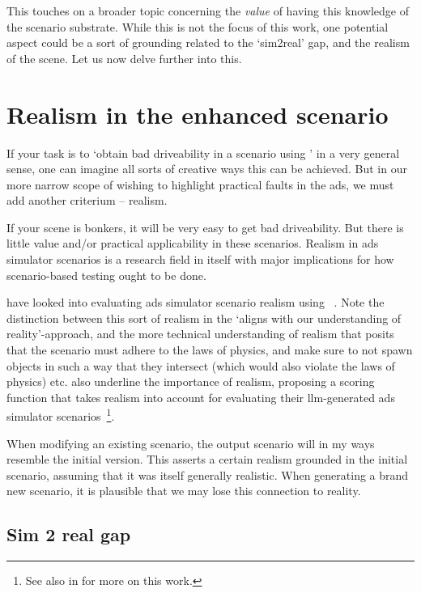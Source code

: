This touches on a broader topic concerning the \emph{value} of having this knowledge of the
scenario substrate. While this is not the focus of this work, one potential aspect could be a sort
of grounding related to the `sim2real' gap, and the realism of the scene. Let us now delve further
into this.

\section{Realism in the enhanced scenario}

If your task is to `obtain bad driveability in a scenario using ' in a very general
sense, one can imagine all sorts of creative ways this can be achieved. But in our more narrow scope
of wishing to highlight practical faults in the \acrshort{ads}, we must add another criterium --
realism.

If your scene is bonkers, it will be very easy to get bad driveability. But there is little value
and/or practical applicability in these scenarios. Realism in \acrshort{ads} simulator scenarios is
a research field in itself with major implications for how scenario-based testing ought to be done.

\citeauthor{RealityBites} have looked into evaluating \acrshort{ads} simulator scenario realism
using ~\cite[40]{RealityBites}. Note the distinction between this sort of realism in
the `aligns with our understanding of reality'-approach, and the more technical understanding of
realism that posits that the scenario must adhere to the laws of physics, and make sure to not spawn
objects in such a way that they intersect (which would also violate the laws of physics) etc.
\citeauthor{LLMScenarioChang24} also underline the importance of realism, proposing a scoring
function that takes realism into account for evaluating their \acrshort{llm}-generated
\acrshort{ads} simulator scenarios~\cite[6581-6582]{LLMScenarioChang24}\footnote{See also
     in  for more on this work.}.

When modifying an existing scenario, the output scenario will in my ways resemble the initial
version. This asserts a certain realism grounded in the initial scenario, assuming that it was
itself generally realistic. When generating a brand new scenario, it is plausible that we may lose
this connection to reality.

\subsection{Sim 2 real gap}

